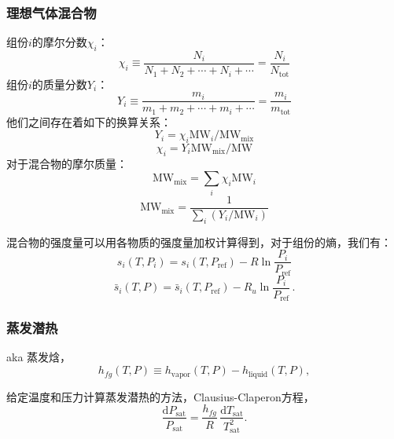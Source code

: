 \subsubsection{理想气体混合物}
组份$i$的摩尔分数$\chi_i$：
\begin{equation}
    \chi_{i}\equiv\frac{N_{i}}{N_{1}+N_{2}+\cdots+N_{i}+\cdots}=\frac{N_{i}}{N_{\mathrm{tot}}}
\end{equation}
组份$i$的质量分数$Y_i$：
\begin{equation}
    Y_{i}\equiv\frac{m_{i}}{m_{1}+m_{2}+\cdots+m_{i}+\cdots}=\frac{m_{i}}{m_{\mathrm{tot}}}
\end{equation}
他们之间存在着如下的换算关系：
\begin{equation}
    Y_{i}=\chi_{i}\mathrm{M}\mathrm{W}_{i}/\mathrm{M}\mathrm{W}_{\mathrm{mix}}
\end{equation}
\begin{equation}
    \chi_{i}=Y_{i}\mathrm{MW}_{\mathrm{mix}}/\mathrm{MW}
\end{equation}
对于混合物的摩尔质量：
\begin{equation}
    \mathrm{MW}_\mathrm{mix} = \sum_i \chi_i \mathrm{MW}_i
\end{equation}
\begin{equation}
    \mathrm{MW}_\mathrm{mix} = \frac{1}{\sum_i (Y_i/\mathrm{MW}_i)}
\end{equation}

混合物的强度量可以用各物质的强度量加权计算得到，对于组份的熵，我们有：
\begin{equation}
    s_{i}(T,P_{i})=s_{i}(T,P_{\mathrm{ref}})-R\ln{\frac{P_{i}}{P_{\mathrm{ref}}}}
\end{equation}
\begin{equation}
    \bar{s}_{i}(T,P)=\bar{s}_{i}(T,P_{\mathrm{ref}})-R_{u}\ln{\frac{P_{i}}{P_{\mathrm{ref}}}}\,.
\end{equation}

\subsubsection{蒸发潜热}
aka 蒸发焓，
\begin{equation}
    h_{fg}(T,P)\equiv h_{\mathrm{vapor}}(T,P)-h_{\mathrm{liquid}}(T,P),
\end{equation}

给定温度和压力计算蒸发潜热的方法，Clausius-Claperon方程，
\begin{equation}
    \frac{\mathrm{d}P_{\mathrm{sat}}}{P_{\mathrm{sat}}}=\frac{h_{f g}}{R}\,\frac{\mathrm{d}T_{\mathrm{sat}}}{T_{\mathrm{sat}}^{2}}.
\end{equation}

